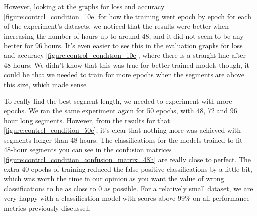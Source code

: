 However, looking at the graphs for loss and accuracy \ref{figure:control_condition_10e} for how the training went epoch by epoch for each of the experiment's datasets, 
we noticed that the results were better when increasing the number of hours up to around 48, and it did not seem to be any better for 96 hours. 
It's even easier to see this in the evaluation graphs for loss and accuracy \ref{figure:control_condition_10e}, where there is a straight line after 48 hours. 
We didn't know that this was true for better-trained models though, it could be that we needed to train for more epochs when the segments 
are above this size, which made sense.

To really find the best segment length, we needed to experiment with more epochs. We ran the same experiment again for 50 epochs, with 48, 72 and 96 hour long segments. 
However, from the results for that \ref{figure:control_condition_50e}, it's clear that nothing more was achieved with segments longer than 48 hours. 
The classifications for the models trained to fit 48-hour segments you can see in the confusion matrices \ref{figure:control_condition_confusion_matrix_48h} 
are really close to perfect. The extra 40 epochs of training reduced the false positive classifications by a little bit, which was worth the time in our opinion as 
you want the value of wrong classifications to be as close to 0 as possible. For a relatively small dataset, we are very happy with a classification model 
with scores above 99\% on all performance metrics previously discussed. 

